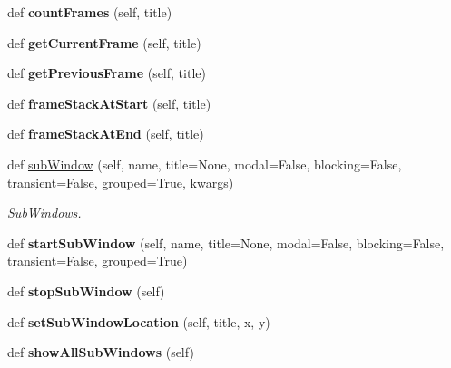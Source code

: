 \begin{DoxyCompactItemize}
def {\bfseries count\+Frames} (self, title)
\item 
\mbox{\label{classappjar_1_1gui_a7923145778b9392c6f86122ac4bf28d4}} 
def {\bfseries get\+Current\+Frame} (self, title)
\item 
\mbox{\label{classappjar_1_1gui_a1f3fad71fcd09310217bfbfdf5f66e0e}} 
def {\bfseries get\+Previous\+Frame} (self, title)
\item 
\mbox{\label{classappjar_1_1gui_a20815b961e160f9fcc6bc2e01ffbec53}} 
def {\bfseries frame\+Stack\+At\+Start} (self, title)
\item 
\mbox{\label{classappjar_1_1gui_a7e342472e8f4f11178403aa169f13a1d}} 
def {\bfseries frame\+Stack\+At\+End} (self, title)
\item 
\mbox{\label{classappjar_1_1gui_a4ba1b0b734f9f51c93c986f16ab3a945}} 
def \hyperlink{classappjar_1_1gui_a4ba1b0b734f9f51c93c986f16ab3a945}{sub\+Window} (self, name, title=None, modal=False, blocking=False, transient=False, grouped=True, kwargs)
\begin{DoxyCompactList}\small\item\em Sub\+Windows. \end{DoxyCompactList}\item 
\mbox{\label{classappjar_1_1gui_a6bb87f37be6f7543dcc64a3d8cb2a32c}} 
def {\bfseries start\+Sub\+Window} (self, name, title=None, modal=False, blocking=False, transient=False, grouped=True)
\item 
\mbox{\label{classappjar_1_1gui_ac313f80664264af74022b29ce6bc4527}} 
def {\bfseries stop\+Sub\+Window} (self)
\item 
\mbox{\label{classappjar_1_1gui_aae8abaabebb7eeb5359894d8e3c81cb5}} 
def {\bfseries set\+Sub\+Window\+Location} (self, title, x, y)
\item 
\mbox{\label{classappjar_1_1gui_a4d5c5a22e317d77c90f238c97c1309e9}} 
def {\bfseries show\+All\+Sub\+Windows} (self)
\item 
\mbox{\label{classappjar_1_1gui_abac089319744d566761a8a958955076c}} 

\end{DoxyCompactItemize}
